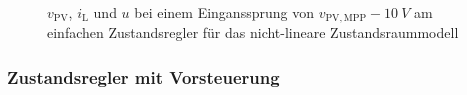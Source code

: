\begin{figure}[H]
    \centering
    \caption[Validierung Regler mit einfacher Rückführung (nicht-linear)]{$v_{\mathrm{PV}}$, $i_{\mathrm{L}}$ und $u$ bei einem Einganssprung von $v_{\mathrm{PV,MPP}} - \SI{10}{V}$ am einfachen Zustandsregler für das nicht-lineare Zustandsraummodell}
    \label{fig:Bild21}
\end{figure}

\subsubsection{Zustandsregler mit Vorsteuerung}

